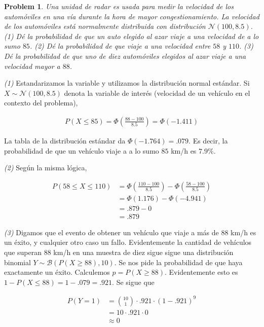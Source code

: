 \documentclass[a4paper, 12pt]{article}
\newtheorem{problem}{Problem}
\newtheorem{problem}{Problem}
\begin{document}
\pagebreak

\begin{problem}
    Una unidad de radar es usada para medir la velocidad de los automóviles en
    una vía durante la hora de mayor congestionamiento. La velocidad de los
    automóviles está normalmente distribuida con distribución $\mathcal{N}(100,
    8.5)$. \textit{(1)} Dé la probabilidad de que un auto elegido al azar viaje
    a una velocidad de a lo sumo $85$. \textit{(2)} Dé la probabilidad de que
    viaje a una velocidad entre $58$ y $110$. \textit{(3)} Dé la probabilidad de
    que uno de diez automóviles elegidos al azar viaje a una velocidad mayor a
    $88$.
\end{problem}

\textit{(1)} Estandarizamos la variable y utilizamos la distribución normal
estándar. Si $X \sim \mathcal{N}(100, 8.5)$ denota la variable de interés
(velocidad de un vehículo en el contexto del problema),

\begin{align*}
    P(X \leq 85) = \Phi \left( \frac{88 - 100}{8.5} \right) = \Phi(-1.411)
\end{align*}

La tabla de la distribución estándar da $\Phi(-1.764) = .079$. Es decir, la
probabilidad de que un vehículo viaje a a lo sumo $85$ km/h es $7.9\%$.

\textit{(2)} Según la misma lógica, 

\begin{align*}
    P(58 \leq X \leq 110) &= \Phi \left( \frac{110 - 100}{8.5} \right) - \Phi
    \left( \frac{58 - 100}{8.5} \right) \\ &= \Phi(1.176) - \Phi(-4.941) \\
                                           &=.879 - 0 \\ &=.879
\end{align*}

\textit{(3)} Digamos que el evento de obtener un vehículo que viaje a más de
$88$ km/h es un éxito, y cualquier otro caso un fallo. Evidentemente la cantidad
de vehículos que superan $88$ km/h en una muestra de diez sigue
sigue una distribución binomial $Y \sim \mathcal{B}\left( P(X
\geq 88), 10 \right) $. Se nos pide la probabilidad de que haya exactamente un
éxito. Calculemos $p = P(X \geq 88)$. Evidentemente esto es $1 - P(X \leq 88) =
1 - .079 = .921$. Se sigue que  

\begin{align*}
    P(Y = 1) &= \binom{10}{1}\cdot .921 \cdot (1 - .921)^{9} \\ 
             &= 10 \cdot .921 \cdot 0 \\ 
             &\approx 0
\end{align*}
\end{document}
